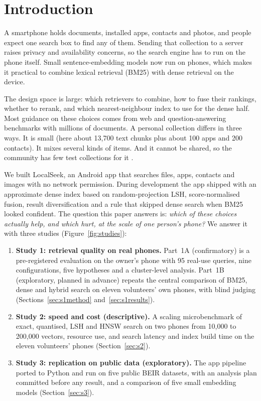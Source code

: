 \documentclass[pdflatex,sn-basic,Numbered]{sn-jnl}
\begin{document}
\section{Introduction}

A smartphone holds documents, installed apps, contacts and photos, and people expect one search box to find any of them. Sending that collection to a server raises privacy and availability concerns, so the search engine has to run on the phone itself. Small sentence-embedding models now run on phones, which makes it practical to combine lexical retrieval (BM25) with dense retrieval on the device.

The design space is large: which retrievers to combine, how to fuse their rankings, whether to rerank, and which nearest-neighbour index to use for the dense half. Most guidance on these choices comes from web and question-answering benchmarks with millions of documents. A personal collection differs in three ways. It is small (here about 13,700 text chunks plus about 100 apps and 200 contacts). It mixes several kinds of items. And it cannot be shared, so the community has few test collections for it \citep{kim2009pseudodesktop}.

We built LocalSeek, an Android app that searches files, apps, contacts and images with no network permission. During development the app shipped with an approximate dense index based on random-projection LSH, score-normalised fusion, result diversification and a rule that skipped dense search when BM25 looked confident. The question this paper answers is: \emph{which of these choices actually help, and which hurt, at the scale of one person's phone?} We answer it with three studies (Figure~\ref{fig:studies}):
\begin{enumerate}
  \item \textbf{Study 1: retrieval quality on real phones.} Part~1A (confirmatory) is a pre-registered evaluation on the owner's phone with 95 real-use queries, nine configurations, five hypotheses and a cluster-level analysis. Part~1B (exploratory, planned in advance) repeats the central comparison of BM25, dense and hybrid search on eleven volunteers' own phones, with blind judging (Sections~\ref{sec:s1method} and~\ref{sec:s1results}).
  \item \textbf{Study 2: speed and cost (descriptive).} A scaling microbenchmark of exact, quantised, LSH and HNSW search on two phones from 10,000 to 200,000 vectors, resource use, and search latency and index build time on the eleven volunteers' phones (Section~\ref{sec:s2}).
  \item \textbf{Study 3: replication on public data (exploratory).} The app pipeline ported to Python and run on five public BEIR datasets, with an analysis plan committed before any result, and a comparison of five small embedding models (Section~\ref{sec:s3}).
\end{enumerate}
\end{document}
